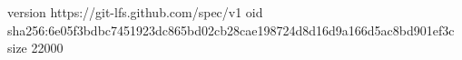 version https://git-lfs.github.com/spec/v1
oid sha256:6e05f3bdbc7451923dc865bd02cb28cae198724d8d16d9a166d5ac8bd901ef3c
size 22000
